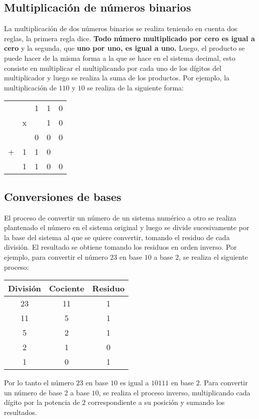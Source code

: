 \subsection{Multiplicación de números binarios}
La multiplicación de dos números binarios se realiza teniendo en cuenta dos reglas, la primera regla dice. \textbf{Todo número multiplicado por cero es igual a cero} y la segunda, que \textbf{uno por uno, es igual a uno.} Luego, el producto se puede hacer de la misma forma a la que se hace en el sistema decimal, esto consiste en multiplicar el multiplicando por cada uno de los dígitos del multiplicador y luego se realiza la suma de los productos.
Por ejemplo, la multiplicación de $110$ y $10$ se realiza de la siguiente forma:
\begin{table}[h]
    \centering
    \begin{tabular}{ccccc}
        &   & 1 & 1 & 0 \\
        & x &   & 1 & 0 \\ \hline
        &   & 0 & 0 & 0 \\
        + & 1 & 1 & 0 &  \\ \hline
        & 1 & 1 & 0 & 0
    \end{tabular}
\end{table}

\subsection{Conversiones de bases}
El proceso de convertir un número de un sistema numérico a otro se realiza plantenado el número en el sistema original y luego se divide sucesivamente por la base del sistema al que se quiere convertir, tomando el residuo de cada división. El resultado se obtiene tomando los residuos en orden inverso. Por ejemplo, para convertir el número $23$ en base $10$ a base $2$, se realiza el siguiente proceso:
\begin{table}[h]
    \centering
    \begin{tabular}{c|c|c}
        \textbf{División} & \textbf{Cociente} & \textbf{Residuo} \\ \hline
        23                & 11                & 1                \\
        11                & 5                 & 1                \\
        5                 & 2                 & 1                \\
        2                 & 1                 & 0                \\
        1                 & 0                 & 1
    \end{tabular}
\end{table}
Por lo tanto el número $23$ en base $10$ es igual a $10111$ en base $2$. Para convertir un número de base $2$ a base $10$, se realiza el proceso inverso, multiplicando cada dígito por la potencia de $2$ correspondiente a su posición y sumando los resultados.

